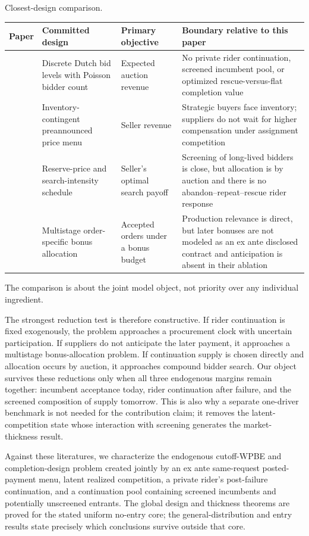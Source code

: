 \documentclass[mnsc,blindrev]{informs3}
\begin{document}
\begin{table}
\TABLE
{Closest-design comparison.\label{tab:closest}}
{\begin{tabularx}{\textwidth}{L{28mm}L{37mm}L{35mm}>{\raggedright\arraybackslash}X}
\toprule
Paper & Committed design & Primary objective & Boundary relative to this paper\\
\midrule
\citet{LiKuo2013}
& Discrete Dutch bid levels with Poisson bidder count
& Expected auction revenue
& No private rider continuation, screened incumbent pool, or optimized rescue-versus-flat completion value\\
\citet{CorreaEtAl2016}
& Inventory-contingent preannounced price menu
& Seller revenue
& Strategic buyers face inventory; suppliers do not wait for higher compensation under assignment competition\\
\citet{LeeLi2023}
& Reserve-price and search-intensity schedule
& Seller's optimal search payoff
& Screening of long-lived bidders is close, but allocation is by auction and there is no abandon--repeat--rescue rider response\\
\citet{WuEtAl2022}
& Multistage order-specific bonus allocation
& Accepted orders under a bonus budget
& Production relevance is direct, but later bonuses are not modeled as an ex ante disclosed contract and anticipation is absent in their ablation\\
\bottomrule
\end{tabularx}}
{The comparison is about the joint model object, not priority over any
individual ingredient.}
\end{table}

The strongest reduction test is therefore constructive.  If rider
continuation is fixed exogenously, the problem approaches a procurement
clock with uncertain participation.  If suppliers do not anticipate the
later payment, it approaches a multistage bonus-allocation problem.  If
continuation supply is chosen directly and allocation occurs by auction, it
approaches compound bidder search.  Our object survives these reductions only
when all three endogenous margins remain together: incumbent acceptance
today, rider continuation after failure, and the screened composition of
supply tomorrow.  This is also why a separate one-driver benchmark is not
needed for the contribution claim; it removes the latent-competition state
whose interaction with screening generates the market-thickness result.

Against these literatures, we characterize the
endogenous cutoff-WPBE and completion-design problem created jointly by an ex ante
same-request posted-payment menu, latent realized competition, a private
rider's post-failure continuation, and a continuation pool containing screened
incumbents and potentially unscreened entrants.  The global design and
thickness theorems are proved for the stated uniform no-entry core; the
general-distribution and entry results state precisely which conclusions
survive outside that core.
\end{document}
